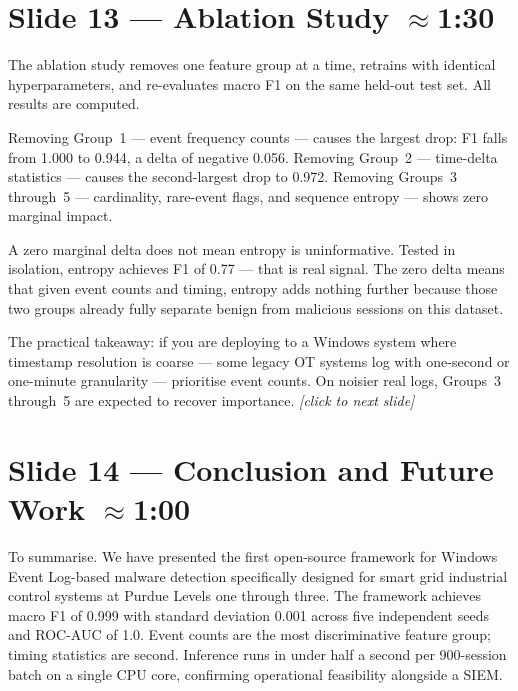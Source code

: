 \documentclass[14pt]{article}
\begin{document}
\section*{Slide 13 — Ablation Study \hfill \normalfont\small $\approx$1:30}

The ablation study removes one feature group at a time, retrains with identical hyperparameters, and re-evaluates macro F1 on the same held-out test set. All results are computed.

Removing Group~1 --- event frequency counts --- causes the largest drop: F1 falls from 1.000 to 0.944, a delta of negative 0.056. Removing Group~2 --- time-delta statistics --- causes the second-largest drop to 0.972. Removing Groups~3 through~5 --- cardinality, rare-event flags, and sequence entropy --- shows zero marginal impact.

A zero marginal delta does not mean entropy is uninformative. Tested in isolation, entropy achieves F1 of 0.77 --- that is real signal. The zero delta means that given event counts and timing, entropy adds nothing further because those two groups already fully separate benign from malicious sessions on this dataset.

The practical takeaway: if you are deploying to a Windows system where timestamp resolution is coarse --- some legacy OT systems log with one-second or one-minute granularity --- prioritise event counts. On noisier real logs, Groups~3 through~5 are expected to recover importance. \textit{[click to next slide]}

\section*{Slide 14 — Conclusion and Future Work \hfill \normalfont\small $\approx$1:00}

To summarise. We have presented the first open-source framework for Windows Event Log-based malware detection specifically designed for smart grid industrial control systems at Purdue Levels one through three. The framework achieves macro F1 of 0.999 with standard deviation 0.001 across five independent seeds and ROC-AUC of 1.0. Event counts are the most discriminative feature group; timing statistics are second. Inference runs in under half a second per 900-session batch on a single CPU core, confirming operational feasibility alongside a SIEM.
\end{document}
